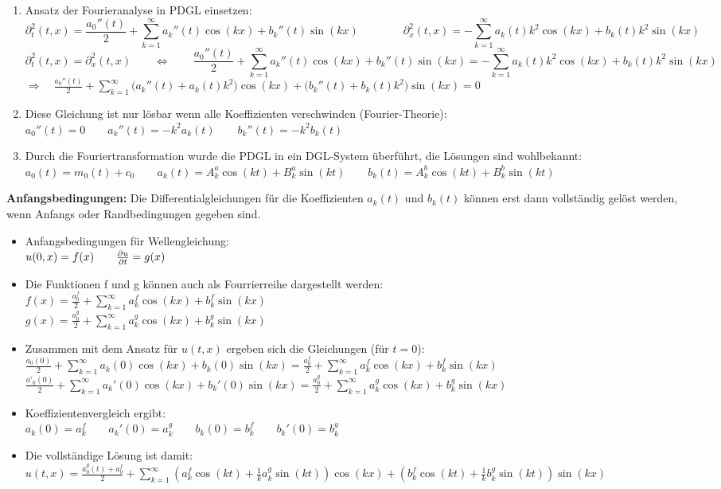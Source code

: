 \begin{enumerate}
\item Ansatz der Fourieranalyse in PDGL einsetzen:\\
$$\partial_t^2(t,x)=\frac{a_0''(t)}{2}+\sum\limits_{k=1}^{\infty}{a_k''(t)\cos(kx)+b_k''(t)\sin(kx)} 
\qquad \qquad
\partial_x^2(t,x)=-\sum\limits_{k=1}^{\infty}{a_k(t)k^2\cos(kx)+b_k(t)k^2\sin(kx)}$$
$$\partial_t^2(t,x)=\partial_x^2(t,x) 
\qquad \Longleftrightarrow \qquad \frac{a_0''(t)}{2}+\sum\limits_{k=1}^{\infty}{a_k''(t)\cos(kx)+b_k''(t)\sin(kx)}=-\sum\limits_{k=1}^{\infty}{a_k(t)k^2\cos(kx)+b_k(t)k^2\sin(kx)}$$
$\boxed{\Rightarrow\quad \frac{a_0''(t)}{2}+\sum\limits_{k=1}^{\infty}{\big(a_k''(t)+a_k(t)k^2\big)\cos(kx)+\big(b_k''(t)+b_k(t)k^2\big)\sin(kx)}=0}$
\item Diese Gleichung ist nur lösbar wenn alle Koeffizienten verschwinden (Fourier-Theorie):\\[0.2cm]
$a_0''(t)=0 \qquad a_k''(t)=-k^2a_k(t)\qquad b_k''(t)=-k^2b_k(t)$
\item Durch die Fouriertransformation wurde die PDGL in ein DGL-System überführt, die Lösungen sind wohlbekannt:\\[0.2cm]
$a_0(t)=m_0(t)+c_0\qquad a_k(t)=A_k^a\cos(kt)+B_k^a\sin(kt)\qquad b_k(t)=A_k^b\cos(kt)+B_k^b\sin(kt)$
\end{enumerate}


\textbf{Anfangsbedingungen:}
Die Differentialgleichungen für die Koeffizienten $a_k(t)$ und $b_k(t)$ können erst dann
vollständig gelöst werden, wenn Anfangs oder Randbedingungen gegeben sind.\\
\begin{itemize}
\item Anfangsbedingungen für Wellengleichung:\\
\quad $u(0,x)=f(x)\qquad \frac{\partial u}{\partial t}=g(x)$
\item Die Funktionen f und g können auch als Fourrierreihe dargestellt werden:\\
$f(x)=\frac{a_0^f}{2}+\sum\limits_{k=1}^{\infty}{a^f_k\cos(kx)+b^f_k\sin(kx)}$\\[0.2cm]
$g(x)=\frac{a_0^g}{2}+\sum\limits_{k=1}^{\infty}{a^g_k\cos(kx)+b^g_k\sin(kx)}$
\item Zusammen mit dem Ansatz für $u(t,x)$ ergeben sich die Gleichungen (für $t=0$):\\
$\frac{a_0(0)}{2}+\sum\limits_{k=1}^{\infty}{a_k(0)\cos(kx)+b_k(0)\sin(kx)}=\frac{a_0^f}{2}+\sum\limits_{k=1}^{\infty}{a_k^f\cos(kx)+b^f_k\sin(kx)}$\\[0.2cm]
$\frac{a'_0(0)}{2}+\sum\limits_{k=1}^{\infty}{a_k'(0)\cos(kx)+b_k'(0)\sin(kx)}=\frac{a_0^g}{2}+\sum\limits_{k=1}^{\infty}{a_k^g\cos(kx)+b^g_k\sin(kx)}$
\item Koeffizientenvergleich ergibt:\\
$a_k(0)=a_k^f\qquad a_k'(0)=a_k^g\qquad b_k(0)=b_k^f\qquad b_k'(0)=b_k^g$
\item Die vollständige Lösung ist damit:\\
$u(t,x)=\frac{a_0^g(t)+a_0^f}2+\sum\limits_{k=1}^{\infty}{\left(a_k^f\cos(kt)+\frac 1k a_k^g\sin(kt)\right)\cos(kx)+\left(b_k^f\cos(kt)+\frac 1k b_k^g\sin(kt)\right)}\sin(kx)$
\end{itemize}


